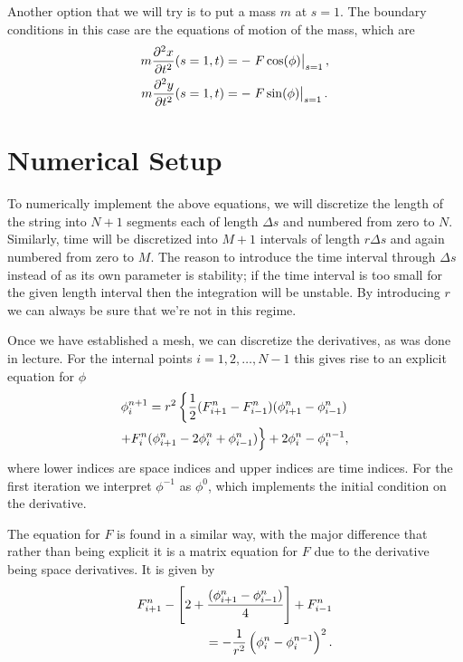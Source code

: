 \documentclass[10pt,a4paper,twocolumn]{article}
\begin{document}
Another option that we will try is to put a mass $m$ at $s=1$. The boundary conditions in this case are the equations of motion of the mass, which are
%
\begin{align}
    m \frac{\partial^2 x}{\partial t^2}(s=1,t) &= - \left. F \cos(\phi) \right|_{s=1},\notag\\
    m \frac{\partial^2 y}{\partial t^2}(s=1,t) &= - \left. F \sin(\phi) \right|_{s=1}.
\end{align}

\section{Numerical Setup}

To numerically implement the above equations, we will discretize the length of the string into $N + 1$ segments each of length $\Delta s$ and numbered from zero to $N$. Similarly, time will be discretized into $M+1$ intervals of length $r \Delta s$ and again numbered from zero to $M$. The reason to introduce the time interval through $\Delta s$ instead of as its own parameter is stability; if the time interval is too small for the given length interval then the integration will be unstable. By introducing $r$ we can always be sure that we're not in this regime.

Once we have established a mesh, we can discretize the derivatives, as was done in lecture. For the internal points $i=1,2,\dots, N-1$ this gives rise to an explicit equation for $\phi$
%
\begin{align}
    \phi_i^{n+1} = r^2 \left\lbrace \frac{1}{2} (F_{i+1}^n - F_{i-1}^n) (\phi_{i+1}^n - \phi_{i-1}^n) \right.\notag\\ +F_i^n (\phi_{i+1}^n - 2 \phi_i^n + \phi_{i-1}^n)\Big\rbrace + 2 \phi_i^n - \phi_i^{n-1},
\end{align}
%
where lower indices are space indices and upper indices are time indices. For the first iteration we interpret $\phi^{-1}$ as $\phi^0$, which implements the initial condition on the derivative.

The equation for $F$ is found in a similar way, with the major difference that rather than being explicit it is a matrix equation for $F$ due to the derivative being space derivatives. It is given by
%
\begin{align}
    F_{i+1}^n - \left[2 + \frac{(\phi_{i+1}^n - \phi_{i-1}^n)}{4}\right] + F_{i-1}^n \notag\\
    = - \frac{1}{r^2} \left(\phi_i^n - \phi_i^{n-1}\right)^2.
\end{align}
\end{document}
